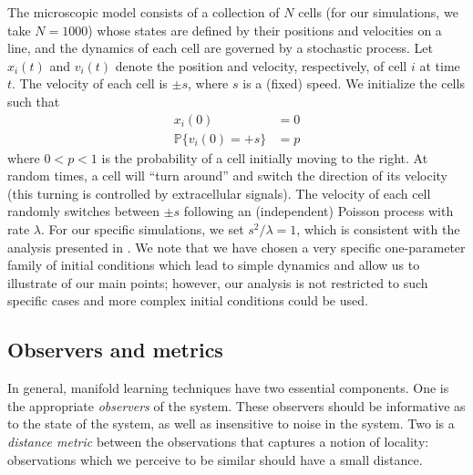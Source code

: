 \documentclass[preprint]{elsarticle}
\begin{document}
The microscopic model consists of a collection of $N$ cells (for our simulations, we take $N=1000$) whose states are defined by their positions and velocities on a line, and the dynamics of each cell are governed by a stochastic process.
%
Let $x_i(t)$ and $v_i(t)$ denote the position and velocity, respectively, of cell $i$ at time $t$.
%
The velocity of each cell is $\pm s$, where $s$ is a (fixed) speed. 
%
We initialize the cells such that
\begin{equation}\label{eqn:system}
\begin{aligned}
x_i(0) & = 0 \\
\mathbb{P} \{ v_i(0) = +s \} & = p
\end{aligned}
\end{equation}
where $0 < p < 1$ is the probability of a cell initially moving to the right.
%
At random times, a cell will ``turn around'' and switch the direction of its velocity (this turning is controlled by extracellular signals). 
%
The velocity of each cell randomly switches between $\pm s$ following an (independent) Poisson process with rate $\lambda$.
%
For our specific simulations, we set $s^2/\lambda=1$, which is consistent with the analysis presented in \cite{...}. 
%
We note that we have chosen a very specific one-parameter family of initial conditions which lead to simple dynamics and allow us to illustrate of our main points;
however, our analysis is not restricted to such specific cases and more complex initial conditions could be used. 

\subsection{Observers and metrics}

In general, manifold learning techniques have two essential components.
%
One is the appropriate {\em observers} of the system. 
%
These observers should be informative as to the state of the system, as well as insensitive to noise in the system. 
%
Two is a {\em distance metric} between the observations that captures a notion of locality: observations which we perceive to be similar should have a small distance. 
%
\end{document}
